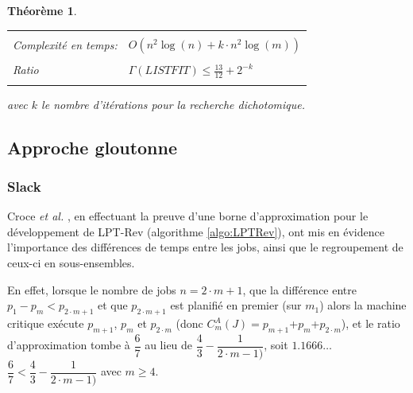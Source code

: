 \documentclass[a4paper,12pt]{report}
\theoremstyle{plain}				%
\newtheorem{theoreme}{Théorème}	%
\theoremstyle{definition}				%
\begin{document}
\bigskip
\begin{theoreme}
\begin{flushleft}
\begin{tabular}{|p{8cm}p{6cm}|}
\hline
& \\
Complexité en temps:& $O(n^2 \log(n) + k \cdot n^2 \log(m))$
\\	%
& \\
Ratio \cite{gupta2001listfit} & $\Gamma(LISTFIT) \leq \frac{13}{12} + 2^{-k}$
\\
& \\
\hline
\end{tabular}
\end{flushleft}
avec $k$ le nombre d'itérations pour la recherche dichotomique.
\end{theoreme}


\subsection{Approche gloutonne} \label{ssec:heuristiquesGloutonne}

\subsubsection{Slack} %

Croce \emph{et al.} \cite{della2018longest}, en effectuant la preuve
d'une borne d'approximation pour le
développement de LPT-Rev (algorithme \ref{algo:LPTRev}), ont mis en évidence l'importance des différences de temps entre les jobs, 
ainsi que le regroupement de ceux-ci en sous-ensembles.

En effet, lorsque le nombre de jobs $n =2 \cdot m + 1$, que la différence entre $p_1 - p_m < p_{2 \cdot m + 1}$ et que 
$p_{2 \cdot m + 1}$ est planifié en premier (sur $m_1$) 
alors la machine critique exécute $p_{m+1}$, $p_m$ et $p_{2 \cdot m}$
(donc $C_m^A(J) = p_{m+1}$+$p_m$+$p_{2 \cdot m} $), 
et le ratio d'approximation tombe à 
$\dfrac{6}{7}$ au lieu de 
$\dfrac{4}{3} - \dfrac{1}{2 \cdot m -1)}$, 
soit $1.1666 \ldots$ \\
$\dfrac{6}{7} < \dfrac{4}{3} - \dfrac{1}{2 \cdot m -1)}$ avec $m \geq 4$.
\end{document}
